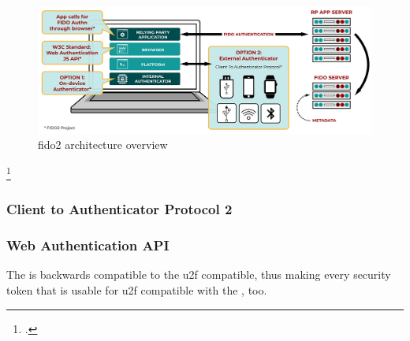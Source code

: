 \begin{figure}[hbt]
	\centering
	\includegraphics[width=\textwidth]{pics/FIDO2-Graphic-v2}
	\caption[\gls{fido}2 architecture overview]{\gls{fido}2 architecture overview\footnotemark}
	\label{fig:fido2_architecture}
\end{figure}
\footcitetext[Source: https://fidoalliance.org/specifications/][4]{uaf-overview}


\subsubsection{Client to Authenticator Protocol 2}

\subsubsection{Web Authentication API}

The \wa{} is backwards compatible to the \gls{u2f} compatible, thus making every security token that is usable for \gls{u2f} compatible with the \wa, too.